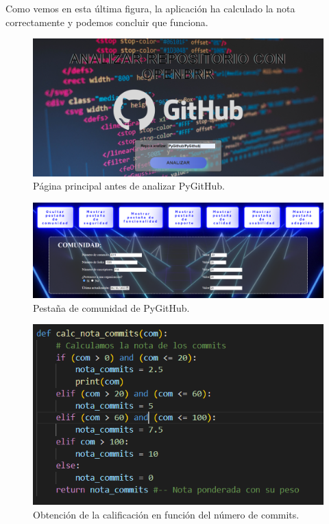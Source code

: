\documentclass[a4paper, 12pt]{book}
\begin{document}
Como vemos en esta última figura, la aplicación ha calculado la nota correctamente y podemos concluir que funciona.
\begin{figure}
    \centering
    \includegraphics[width=1\textwidth, keepaspectratio]{img/principal_main.png}
    \caption{Página principal antes de analizar PyGitHub.}\label{fig:pricipal_pygithub}
\end{figure}
\begin{figure}
    \centering
    \includegraphics[width=1\textwidth, keepaspectratio]{img/pygithub_comunidad.png}
    \caption{Pestaña de comunidad de PyGitHub.}\label{fig:comunidad_pygithub}
\end{figure}
\begin{figure}
    \centering
    \includegraphics[width=1\textwidth, keepaspectratio]{img/nota_commits.png}
    \caption{Obtención de la calificación en función del número de commits.}\label{fig:nota_commits}
\end{figure}
\end{document}
